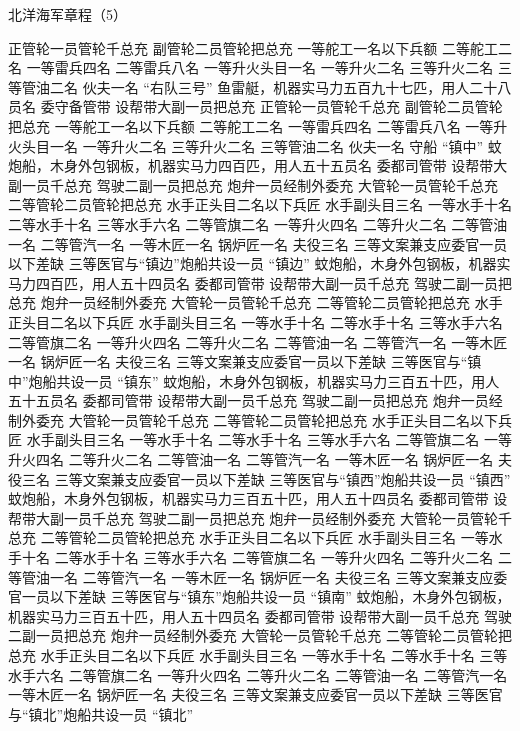\documentclass[12pt,UTF8]{ctexbook}
\begin{document}
北洋海军章程（5）

正管轮一员管轮千总充
副管轮二员管轮把总充
一等舵工一名以下兵额
二等舵工二名
一等雷兵四名
二等雷兵八名
一等升火头目一名
一等升火二名
三等升火二名
三等管油二名
伙夫一名
“右队三号”
鱼雷艇，机器实马力五百九十七匹，用人二十八员名
委守备管带
设帮带大副一员把总充
正管轮一员管轮千总充
副管轮二员管轮把总充
一等舵工一名以下兵额
二等舵工二名
一等雷兵四名
二等雷兵八名
一等升火头目一名
一等升火二名
三等升火二名
三等管油二名
伙夫一名
守船
“镇中”
蚊炮船，木身外包钢板，机器实马力四百匹，用人五十五员名
委都司管带
设帮带大副一员千总充
驾驶二副一员把总充
炮弁一员经制外委充
大管轮一员管轮千总充
二等管轮二员管轮把总充
水手正头目二名以下兵匠
水手副头目三名
一等水手十名
二等水手十名
三等水手六名
二等管旗二名
一等升火四名
二等升火二名
二等管油一名
二等管汽一名
一等木匠一名
锅炉匠一名
夫役三名
三等文案兼支应委官一员以下差缺
三等医官与“镇边”炮船共设一员
“镇边”
蚊炮船，木身外包钢板，机器实马力四百匹，用人五十四员名
委都司管带
设帮带大副一员千总充
驾驶二副一员把总充
炮弁一员经制外委充
大管轮一员管轮千总充
二等管轮二员管轮把总充
水手正头目二名以下兵匠
水手副头目三名
一等水手十名
二等水手十名
三等水手六名
二等管旗二名
一等升火四名
二等升火二名
二等管油一名
二等管汽一名
一等木匠一名
锅炉匠一名
夫役三名
三等文案兼支应委官一员以下差缺
三等医官与“镇中”炮船共设一员
“镇东”
蚊炮船，木身外包钢板，机器实马力三百五十匹，用人五十五员名
委都司管带
设帮带大副一员千总充
驾驶二副一员把总充
炮弁一员经制外委充
大管轮一员管轮千总充
二等管轮二员管轮把总充
水手正头目二名以下兵匠
水手副头目三名
一等水手十名
二等水手十名
三等水手六名
二等管旗二名
一等升火四名
二等升火二名
二等管油一名
二等管汽一名
一等木匠一名
锅炉匠一名
夫役三名
三等文案兼支应委官一员以下差缺
三等医官与“镇西”炮船共设一员
“镇西”
蚊炮船，木身外包钢板，机器实马力三百五十匹，用人五十四员名
委都司管带
设帮带大副一员千总充
驾驶二副一员把总充
炮弁一员经制外委充
大管轮一员管轮千总充
二等管轮二员管轮把总充
水手正头目二名以下兵匠
水手副头目三名
一等水手十名
二等水手十名
三等水手六名
二等管旗二名
一等升火四名
二等升火二名
二等管油一名
二等管汽一名
一等木匠一名
锅炉匠一名
夫役三名
三等文案兼支应委官一员以下差缺
三等医官与“镇东”炮船共设一员
“镇南”
蚊炮船，木身外包钢板，机器实马力三百五十匹，用人五十四员名
委都司管带
设帮带大副一员千总充
驾驶二副一员把总充
炮弁一员经制外委充
大管轮一员管轮千总充
二等管轮二员管轮把总充
水手正头目二名以下兵匠
水手副头目三名
一等水手十名
二等水手十名
三等水手六名
二等管旗二名
一等升火四名
二等升火二名
二等管油一名
二等管汽一名
一等木匠一名
锅炉匠一名
夫役三名
三等文案兼支应委官一员以下差缺
三等医官与“镇北”炮船共设一员
“镇北”
\end{document}
